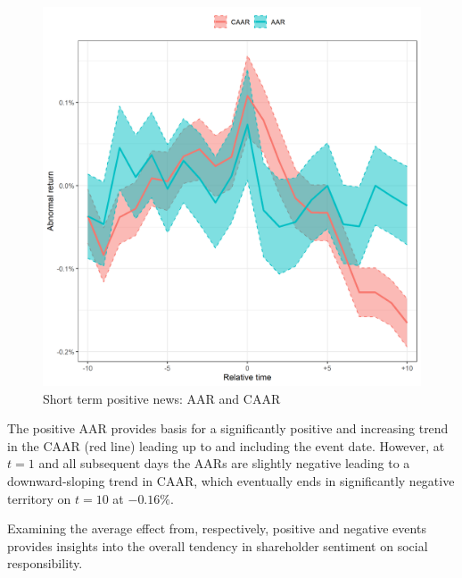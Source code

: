 \begin{figure} [H] 
    \centering
    \includegraphics[scale=0.6]{Projekt/1.Figures analysis/ST_positive_all_CI.png}
    \caption{Short term positive news: AAR and CAAR}
    \label{fig:ST_pos_news}
\end{figure}

The positive AAR provides basis for a significantly positive and increasing trend in the CAAR (red line) leading up to and including the event date. However, at $t = 1$ and all subsequent days the AARs are slightly negative leading to a downward-sloping trend in CAAR, which eventually ends in significantly negative territory on $t = 10$ at $-0.16\%$.

 Examining the average effect from, respectively, positive and negative events provides insights into the overall tendency in shareholder sentiment on social responsibility.  

